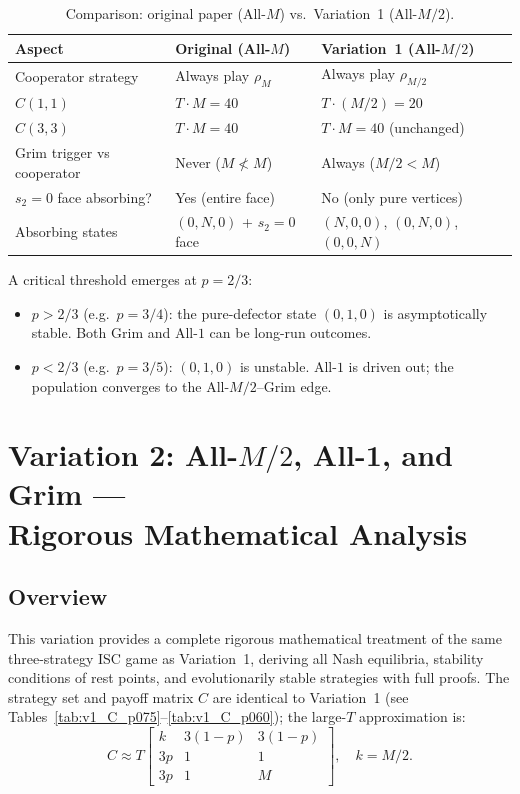\documentclass[12pt,a4paper]{article}
\begin{document}
\begin{table}[H]
\centering
\caption{Comparison: original paper (All-$M$) vs.\ Variation~1 (All-$M/2$).}
\label{tab:v1_differences}
\small
\begin{tabular}{lll}
\toprule
Aspect & Original (All-$M$) & Variation~1 (All-$M/2$) \\
\midrule
Cooperator strategy       & Always play $\rho_M$       & Always play $\rho_{M/2}$ \\
$C(1,1)$                  & $T \cdot M = 40$           & $T \cdot (M/2) = 20$ \\
$C(3,3)$                  & $T \cdot M = 40$           & $T \cdot M = 40$ (unchanged) \\
Grim trigger vs cooperator & Never ($M \not< M$)        & Always ($M/2 < M$) \\
$s_2{=}0$ face absorbing? & Yes (entire face)          & No (only pure vertices) \\
Absorbing states          & $(0,N,0)$ + $s_2{=}0$ face & $(N,0,0)$, $(0,N,0)$, $(0,0,N)$ \\
\bottomrule
\end{tabular}
\end{table}

A critical threshold emerges at $p = 2/3$:
\begin{itemize}
  \item $p > 2/3$ (e.g.\ $p = 3/4$): the pure-defector state $(0,1,0)$ is
        asymptotically stable. Both Grim and All-$1$ can be long-run outcomes.
  \item $p < 2/3$ (e.g.\ $p = 3/5$): $(0,1,0)$ is unstable. All-$1$ is
        driven out; the population converges to the All-$M/2$--Grim edge.
\end{itemize}

\section{Variation 2: All-\texorpdfstring{$M/2$}{M/2}, All-1, and Grim ---\\
Rigorous Mathematical Analysis}
\label{sec:var2}

\subsection{Overview}

This variation provides a complete rigorous mathematical treatment of the same
three-strategy ISC game as Variation~1, deriving all Nash equilibria, stability
conditions of rest points, and evolutionarily stable strategies with full proofs.
The strategy set and payoff matrix $C$ are identical to Variation~1 (see
Tables~\ref{tab:v1_C_p075}--\ref{tab:v1_C_p060}); the large-$T$ approximation
is:
\begin{equation}\label{eq:v2_Capprox}
C \approx T\begin{bmatrix}
k & 3(1-p) & 3(1-p) \\
3p & 1 & 1 \\
3p & 1 & M
\end{bmatrix}, \quad k = M/2.
\end{equation}
\end{document}
